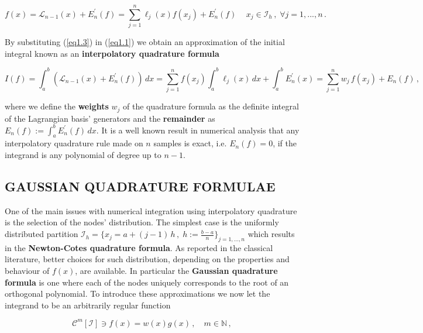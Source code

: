 \documentclass[a4paper, twosided]{book}
\begin{document}
\begin{equation}\label{eq1.3}
    f(x) = \mathcal{L}_{n-1}(x) + E^{'}_n(f) = \sum_{j=1}^{n}\ell_j(x)f(x_j) + E^{'}_n(f)\,\quad x_j\in\mathcal{I}_h\,,\;\forall j=1,...,n\,.
\end{equation}

\color{black}

\noindent
By substituting (\ref{eq1.3}) in (\ref{eq1.1}) we obtain an approximation of the initial integral known as an \color{poliDarkBlue} \textbf{interpolatory quadrature formula} \color{black}

\begin{equation}\label{eq1.4}
    I(f) = \int_a^b (\mathcal{L}_{n-1}(x) + E^{'}_n(f))\,dx = \sum_{j=1}^{n}f(x_j)\int_a^b \ell_j(x)\,dx + \int_a^b E^{'}_n(x) = \sum_{j=1}^{n}w_j\,f(x_j) + E_n(f)\,,
\end{equation}

\noindent
where we define the \color{poliDarkBlue} \textbf{weights} \color{black} $w_j$ of the quadrature formula as the definite integral of the Lagrangian basis' generators and the \color{poliDarkBlue} \textbf{remainder} \color{black} as $E_n(f):=\int_a^b E^{'}_n(f)\,dx$. It is a well known result in numerical analysis that any interpolatory quadrature rule made on $n$ samples is exact, i.e. $E_n(f)=0$, if the integrand is any polynomial of degree up to $n-1$.

\subsection[Gaussian quadrature formulae]{\changefont GAUSSIAN QUADRATURE FORMULAE}\label{SubSec1.2.2}

One of the main issues with numerical integration using interpolatory quadrature is the selection of the nodes' distribution. The simplest case is the uniformly distributed partition 
$\mathcal{I}_h =\big\{x_j = a + (j-1)\,h\,,\;h:=\frac{b-a}{n}\big\}_{j=1,...,n}$ which results in the \color{poliDarkBlue} \textbf{Newton-Cotes quadrature formula}\color{black}. As reported in the classical literature, better choices for such distribution, depending on the properties and behaviour of $f(x)$, are available. In particular the \color{poliDarkBlue} \textbf{Gaussian quadrature formula} \color{black} is one where each of the nodes uniquely corresponds to the root of an orthogonal polynomial. To introduce these approximations we now let the integrand to be an arbitrarily regular function

\begin{equation}\label{eq1.5}
    \mathcal{C}^m[\mathcal{I}]\ni f(x) = w(x)g(x)\,,\quad m\in\mathbb{N}\,,
\end{equation}
\end{document}
